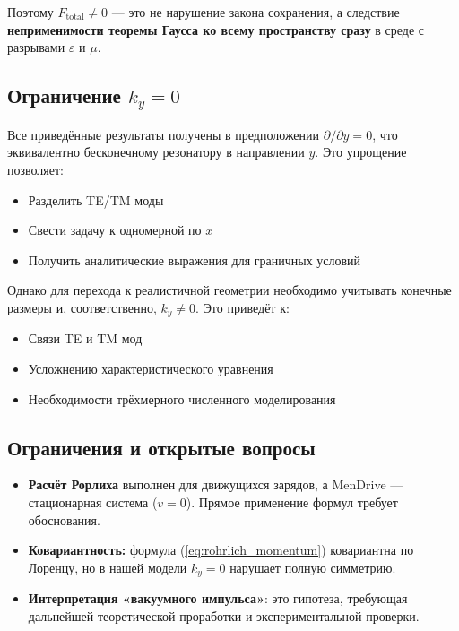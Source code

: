 \documentclass[a4paper,12pt]{article}
\begin{document}
{Поэтому \textbf{$F_{\text{total}} \neq 0$} --- это не нарушение закона 
сохранения, а следствие \textbf{неприменимости теоремы Гаусса ко всему 
пространству сразу} в среде с разрывами $\varepsilon$ и $\mu$.

\subsection{Ограничение $k_y = 0$}

Все приведённые результаты получены в предположении $\partial/\partial y = 0$,
что эквивалентно бесконечному резонатору в направлении $y$. Это упрощение позволяет:
\begin{itemize}
    \item Разделить TE/TM моды
    \item Свести задачу к одномерной по $x$
    \item Получить аналитические выражения для граничных условий
\end{itemize}

Однако для перехода к реалистичной геометрии необходимо учитывать конечные
размеры и, соответственно, $k_y \neq 0$. Это приведёт к:
\begin{itemize}
    \item Связи TE и TM мод
    \item Усложнению характеристического уравнения
    \item Необходимости трёхмерного численного моделирования
\end{itemize}

\subsection{Ограничения и открытые вопросы}

\begin{itemize}
    \item \textbf{Расчёт Рорлиха} выполнен для движущихся зарядов, а MenDrive ---
    стационарная система ($v=0$). Прямое применение формул требует обоснования.

    \item \textbf{Ковариантность:} формула (\ref{eq:rohrlich_momentum})
    ковариантна по Лоренцу, но в нашей модели $k_y = 0$ нарушает полную
    симметрию.

    \item \textbf{Интерпретация «вакуумного импульса»}: это гипотеза,
    требующая дальнейшей теоретической проработки и экспериментальной проверки.


\end{itemize}}
\end{document}
